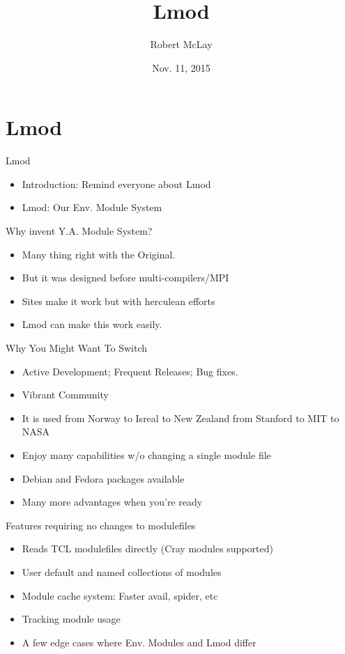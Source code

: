 \documentclass{beamer}
\title{Lmod}
\author{Robert McLay}
\institute{The Texas Advanced Computing Center}
\date{Nov. 11, 2015}  %
\begin{document}
\begin{frame}
  \titlepage
\end{frame}

\section{Lmod}

\begin{frame}{Lmod}
  \begin{itemize}
    \item Introduction: Remind everyone about Lmod
    \item Lmod: Our Env. Module System
  \end{itemize}
\end{frame}

\begin{frame}{Why invent Y.A. Module System?}
  \begin{itemize}
    \item Many thing right with the Original.
    \item But it was designed before multi-compilers/MPI
    \item Sites make it work but with herculean efforts
    \item Lmod can make this work easily.
  \end{itemize}
\end{frame}


\begin{frame}{Why You Might Want To Switch}
  \begin{itemize}
    \item Active Development;  Frequent Releases; Bug fixes.
    \item Vibrant Community
    \item It is used from Norway to Isreal to New Zealand from Stanford to MIT to NASA
    \item Enjoy many capabilities w/o changing a single module file
    \item Debian and Fedora packages available
    \item Many more advantages when you're ready
  \end{itemize}
\end{frame}

\begin{frame}{Features requiring no changes to modulefiles}
  \begin{itemize}
    \item Reads TCL modulefiles directly (Cray modules supported)
    \item User default and named collections of modules
    \item Module cache system: Faster avail, spider, etc
    \item Tracking module usage 
    \item A few edge cases where Env. Modules and Lmod differ
  \end{itemize}
\end{frame}
\end{document}
